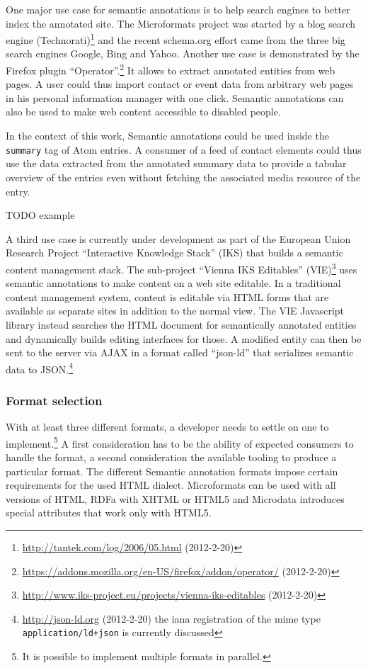 \documentclass[12pt,a4paper]{scrartcl}		%
\newcommand{\citeurl}[2]{\url{#1} (#2)}
\begin{document}
One major use case for semantic annotations is to help search engines to better
index the annotated site. The Microformats project was started by a blog search
engine
(Technorati)\footnote{\citeurl{http://tantek.com/log/2006/05.html}{2012-2-20}}
and the recent schema.org effort came from the three big search engines Google,
Bing and Yahoo. Another use case is demonstrated by the Firefox plugin
``Operator''.\footnote{\citeurl{https://addons.mozilla.org/en-US/firefox/addon/operator/}{2012-2-20}}
It allows to extract annotated entities from web pages. A user could thus import
contact or event data from arbitrary web pages in his personal information
manager with one click. Semantic annotations can also be used to make web
content accessible to disabled people.\cite{Yesilada:2007:EDS:1279700.1279704}

In the context of this work, Semantic annotations could be used inside the
\lstinline:summary: tag of Atom entries. A consumer of a feed of contact
elements could thus use the data extracted from the annotated summary data to
provide a tabular overview of the entries even without fetching the associated
media resource of the entry.

TODO example

A third use case is currently under development as part of the European Union
Research Project ``Interactive Knowledge Stack'' (IKS) that builds a semantic
content management stack. The sub-project ``Vienna IKS Editables''
(VIE)\footnote{\citeurl{http://www.iks-project.eu/projects/vienna-iks-editables}{2012-2-20}}
uses semantic annotations to make content on a web site editable. In a
traditional content management system, content is editable via HTML forms that
are available as separate sites in addition to the normal view.  The VIE
Javascript library instead searches the HTML document for semantically annotated
entities and dynamically builds editing interfaces for those. A modified entity
can then be sent to the server via AJAX in a format called ``json-ld'' that
serializes semantic data to
JSON.\footnote{\citeurl{http://json-ld.org}{2012-2-20} the iana registration of
  the mime type \lstinline:application/ld+json: is currently discussed}

\subsubsection{Format selection}

With at least three different formats, a developer needs to settle on one to
implement.\footnote{It is possible to implement multiple formats in
  parallel.\cite{Tennison2012}} A first consideration has to be the ability of
expected consumers to handle the format, a second consideration the available
tooling to produce a particular format. The different Semantic annotation formats
impose certain requirements for the used HTML dialect. Microformats can be used
with all versions of HTML, RDFa with XHTML or HTML5 and Microdata introduces
special attributes that work only with HTML5.\cite{Tennison2012}
\end{document}
